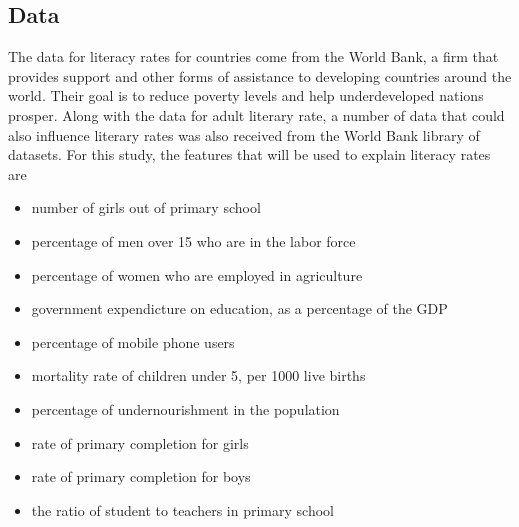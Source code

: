\documentclass[]{article}
\providecommand{\tightlist}{%
  \setlength{\itemsep}{0pt}\setlength{\parskip}{0pt}}
\begin{document}
\hypertarget{data}{%
\subsection{Data}\label{data}}

The data for literacy rates for countries come from the World Bank, a
firm that provides support and other forms of assistance to developing
countries around the world. Their goal is to reduce poverty levels and
help underdeveloped nations prosper. Along with the data for adult
literary rate, a number of data that could also influence literary rates
was also received from the World Bank library of datasets. For this
study, the features that will be used to explain literacy rates are

\begin{itemize}
\tightlist
\item
  number of girls out of primary school
\item
  percentage of men over 15 who are in the labor force
\item
  percentage of women who are employed in agriculture
\item
  government expendicture on education, as a percentage of the GDP
\item
  percentage of mobile phone users
\item
  mortality rate of children under 5, per 1000 live births
\item
  percentage of undernourishment in the population
\item
  rate of primary completion for girls
\item
  rate of primary completion for boys
\item
  the ratio of student to teachers in primary school
\end{itemize}
\end{document}
